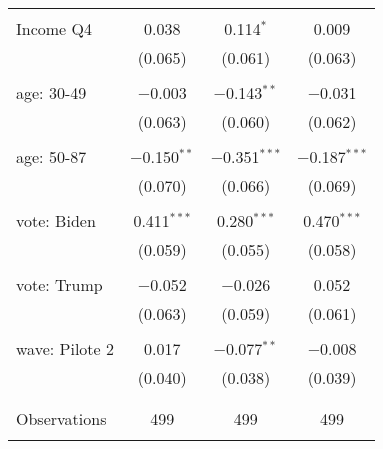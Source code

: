 \begin{tabular}{@{\extracolsep{5pt}}lccc}
  & & & \\ 
 Income Q4 & 0.038 & 0.114$^{*}$ & 0.009 \\ 
  & (0.065) & (0.061) & (0.063) \\ 
  & & & \\ 
 age: 30-49 & $-$0.003 & $-$0.143$^{**}$ & $-$0.031 \\ 
  & (0.063) & (0.060) & (0.062) \\ 
  & & & \\ 
 age: 50-87 & $-$0.150$^{**}$ & $-$0.351$^{***}$ & $-$0.187$^{***}$ \\ 
  & (0.070) & (0.066) & (0.069) \\ 
  & & & \\ 
 vote: Biden & 0.411$^{***}$ & 0.280$^{***}$ & 0.470$^{***}$ \\ 
  & (0.059) & (0.055) & (0.058) \\ 
  & & & \\ 
 vote: Trump & $-$0.052 & $-$0.026 & 0.052 \\ 
  & (0.063) & (0.059) & (0.061) \\ 
  & & & \\ 
 wave: Pilote 2 & 0.017 & $-$0.077$^{**}$ & $-$0.008 \\ 
  & (0.040) & (0.038) & (0.039) \\ 
  & & & \\ 
\hline \\[-1.8ex] 

Observations & 499 & 499 & 499 \\ 
\hline 
\hline \\[-1.8ex] 
\end{tabular} 